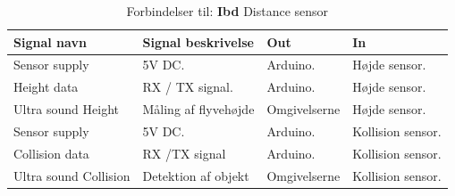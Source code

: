 \begin{table}[H]
	\centering
		\begin{tabular}{|p{2.6 cm}|p{5.2 cm}|p{2.7 cm}|p{2.7 cm}|} 
		\hline
			\textbf{Signal navn} 	& \textbf{Signal beskrivelse}		& \textbf{Out} 				& \textbf{In}     \\ \hline
			Sensor supply 		& 5V DC.  				& Arduino. 			& Højde sensor.  \\ \hline
			Height data 		& RX / TX signal. 		& Arduino.			& Højde sensor.	\\ \hline
			Ultra sound \newline Height 	& Måling af flyvehøjde 	& Omgivelserne		& Højde sensor.	\\ \hline
			
			Sensor supply & 5V DC. & Arduino. & Kollision sensor.	\\ \hline
			Collision data & RX /TX signal & Arduino. & Kollision sensor.			    \\ \hline
			Ultra sound \newline Collision 	& Detektion af objekt	& Omgivelserne		& Kollision sensor.	\\ \hline
			
		\end{tabular}
	\caption{Forbindelser til: \textbf{Ibd} Distance sensor}
	\label{tab:IBDDistancesensor}
\end{table}
